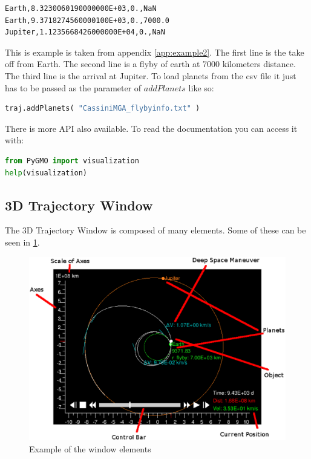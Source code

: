\documentclass[a4paper,11pt]{article}
\begin{document}
\begin{lstlisting}
Earth,8.3230060190000000E+03,0.,NaN
Earth,9.3718274560000100E+03,0.,7000.0
Jupiter,1.1235668426000000E+04,0.,NaN
\end{lstlisting}

This is example is taken from appendix \ref{app:example2}. The first line is the take off from Earth. The second line is a flyby of earth at 7000 kilometers distance. The third line is the arrival at Jupiter. To load planets from the \gls{csv} file it just has to be passed as the parameter of $addPlanets$ like so:

\begin{lstlisting}[language=Python]
traj.addPlanets( "CassiniMGA_flybyinfo.txt" )
\end{lstlisting}

There is more \gls{API} also available. To read the documentation you can access it with:

\begin{lstlisting}[language=Python]
from PyGMO import visualization
help(visualization)
\end{lstlisting}




\subsection{3D Trajectory Window}\label{sec:window}

The 3D Trajectory Window is composed of many elements. Some of these can be seen in \ref{img:guide}.

\begin{figure}[h]
\centering
\includegraphics[width=1\textwidth]{img/guide}
\caption{Example of the window elements}
\label{img:guide}
\end{figure}
\end{document}
